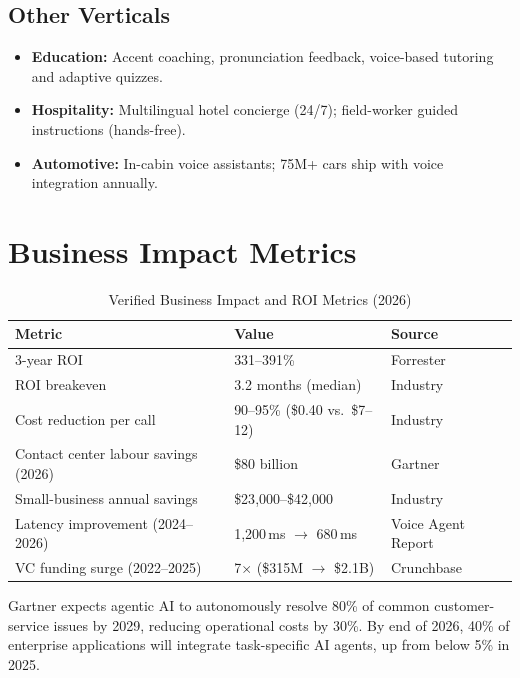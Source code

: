 \documentclass[12pt,a4paper]{article}
\begin{document}
\subsection{Other Verticals}

\begin{itemize}[noitemsep]
  \item \textbf{Education:} Accent coaching, pronunciation feedback, voice-based tutoring and adaptive quizzes.
  \item \textbf{Hospitality:} Multilingual hotel concierge (24/7); field-worker guided instructions (hands-free).
  \item \textbf{Automotive:} In-cabin voice assistants; 75M+ cars ship with voice integration annually.
\end{itemize}

\section{Business Impact Metrics}
\label{sec:impact}

\begin{table}[H]\centering
\caption{Verified Business Impact and ROI Metrics (2026)}
\label{tab:roi}
\begin{tabularx}{\textwidth}{lll}
\toprule
\textbf{Metric} & \textbf{Value} & \textbf{Source} \\
\midrule
3-year ROI                       & 331--391\%                      & Forrester \\
ROI breakeven                    & 3.2 months (median)             & Industry \\
Cost reduction per call          & 90--95\% (\$0.40 vs.\ \$7--12) & Industry \\
Contact center labour savings (2026) & \$80 billion               & Gartner \\
Small-business annual savings    & \$23{,}000--\$42{,}000          & Industry \\
Latency improvement (2024--2026) & 1{,}200\,ms $\to$ 680\,ms      & Voice Agent Report \\
VC funding surge (2022--2025)    & 7$\times$ (\$315M $\to$ \$2.1B)& Crunchbase \\
\bottomrule
\end{tabularx}
\end{table}

Gartner expects agentic AI to autonomously resolve 80\% of common
customer-service issues by 2029, reducing operational costs by 30\%.  By
end of 2026, 40\% of enterprise applications will integrate task-specific AI
agents, up from below 5\% in 2025.
\end{document}
